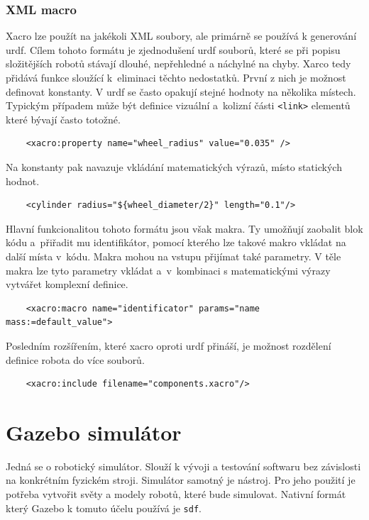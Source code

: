 \subsubsection*{XML macro}
Xacro lze použít na jakékoli XML soubory, ale primárně se používá k generování urdf. Cílem tohoto formátu je zjednodušení urdf souborů, které se při popisu složitějších robotů stávají dlouhé, nepřehledné a náchylné na chyby. Xarco tedy přidává funkce sloužící k~eliminaci těchto nedostatků. 
První z nich je možnost definovat konstanty. V urdf se často opakují stejné hodnoty na několika místech. Typickým případem může být definice vizuální a~kolizní části \verb|<link>| elementů které bývají často totožné. \cite{ros2_documentation} 
\begin{verbatim}
	<xacro:property name="wheel_radius" value="0.035" />
\end{verbatim}
Na konstanty pak navazuje vkládání matematických výrazů, místo statických hodnot.
\begin{verbatim}
	<cylinder radius="${wheel_diameter/2}" length="0.1"/>
\end{verbatim}
Hlavní funkcionalitou tohoto formátu jsou však makra. Ty umožňují zaobalit blok kódu a~přiřadit mu identifikátor, pomocí kterého lze takové makro vkládat na další místa v~kódu. 
Makra mohou na vstupu přijímat také parametry. V těle makra lze tyto parametry vkládat a~v~kombinaci s matematickými výrazy vytvářet komplexní definice.
\begin{verbatim}
	<xacro:macro name="identificator" params="name mass:=default_value">
\end{verbatim}
Posledním rozšířením, které xacro oproti urdf přináší, je možnost rozdělení definice robota do více souborů.
\begin{verbatim}
	<xacro:include filename="components.xacro"/>
\end{verbatim} 

\section{Gazebo simulátor} \label{theory:gazebo}
Jedná se o robotický simulátor. Slouží k vývoji a testování softwaru bez závislosti na konkrétním fyzickém stroji. Simulátor samotný je nástroj. Pro jeho použití je potřeba vytvořit světy a modely robotů, které bude simulovat. Nativní formát který Gazebo k tomuto účelu používá je \verb|sdf|.

